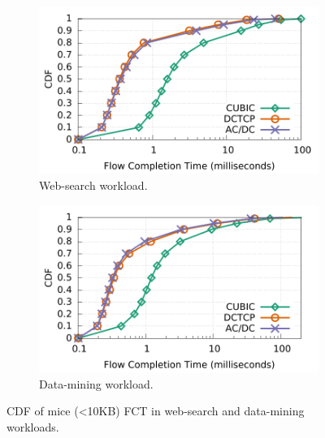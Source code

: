 \begin{figure}[!t]
        \centering
        \begin{subfigure}[b]{0.45\textwidth}
                \centering
                \includegraphics[width=\textwidth]{figures/macro_benchmarks/trace-driven/trace_driven_workload_dctcp_senders5_10points.pdf}
                \caption{Web-search workload.}
                \label{trace-driven-searching-fct}
        \end{subfigure}
        \begin{subfigure}[b]{0.45\textwidth}
                \centering
                \includegraphics[width=\textwidth]{figures/macro_benchmarks/trace-driven/trace_driven_workload_conga_senders5_10points.pdf}
                \caption{Data-mining workload.}
                \label{trace-driven-data-mining-fct}
        \end{subfigure}
        \caption{CDF of mice (<10KB) FCT in web-search and data-mining workloads.}
        \label{macro-trace-driven-fct}
\end{figure}
\fi


